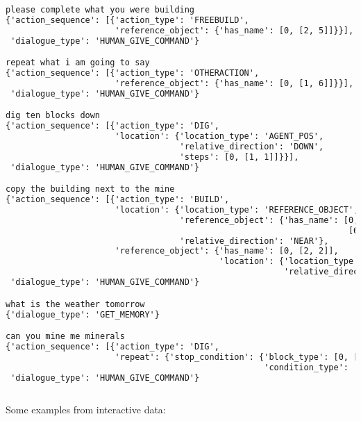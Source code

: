\begin{lstlisting}[language=TeX]
please complete what you were building
{'action_sequence': [{'action_type': 'FREEBUILD',
                      'reference_object': {'has_name': [0, [2, 5]]}}],
 'dialogue_type': 'HUMAN_GIVE_COMMAND'}

repeat what i am going to say
{'action_sequence': [{'action_type': 'OTHERACTION',
                      'reference_object': {'has_name': [0, [1, 6]]}}],
 'dialogue_type': 'HUMAN_GIVE_COMMAND'}

dig ten blocks down
{'action_sequence': [{'action_type': 'DIG',
                      'location': {'location_type': 'AGENT_POS',
                                   'relative_direction': 'DOWN',
                                   'steps': [0, [1, 1]]}}],
 'dialogue_type': 'HUMAN_GIVE_COMMAND'}

copy the building next to the mine
{'action_sequence': [{'action_type': 'BUILD',
                      'location': {'location_type': 'REFERENCE_OBJECT',
                                   'reference_object': {'has_name': [0,
                                                                     [6, 6]]},
                                   'relative_direction': 'NEAR'},
                      'reference_object': {'has_name': [0, [2, 2]],
                                           'location': {'location_type': 'REFERENCE_OBJECT',
                                                        'relative_direction': 'NEAR'}}}],
 'dialogue_type': 'HUMAN_GIVE_COMMAND'}

what is the weather tomorrow
{'dialogue_type': 'GET_MEMORY'}

can you mine me minerals
{'action_sequence': [{'action_type': 'DIG',
                      'repeat': {'stop_condition': {'block_type': [0, [4, 4]],
                                                    'condition_type': 'ADJACENT_TO_BLOCK_TYPE'}}}],
 'dialogue_type': 'HUMAN_GIVE_COMMAND'}
 
\end{lstlisting}

Some examples from interactive data:

